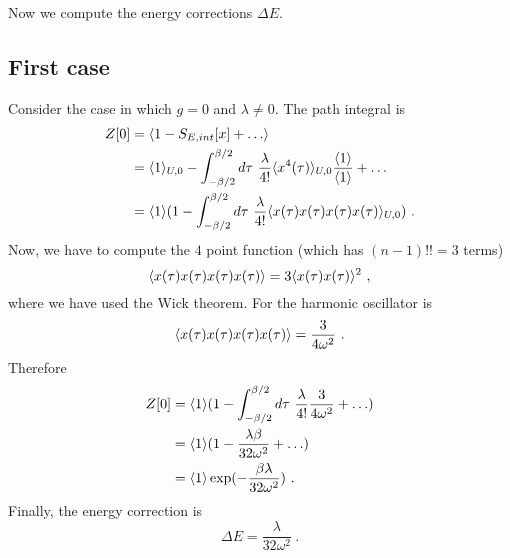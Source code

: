     Now we compute the energy corrections $\Delta E$. 

\subsection{First case}
    Consider the case in which $g = 0$ and $\lambda \neq 0$. The path integral is 
    \begin{equation*}
    \begin{aligned}
        Z[0] & = \langle1 - S_{E, int} [x] + \ldots\rangle \\ & = \langle1\rangle_{U, 0} - \int_{- \beta / 2}^{\beta/2} d\tau ~ \frac{\lambda}{4!} \langle x^4(\tau)\rangle_{U, 0} \frac{\langle1\rangle}{\langle1\rangle} + \ldots \\ & = \langle1\rangle ( 1 - \int_{- \beta / 2}^{\beta/2} d\tau ~ \frac{\lambda}{4!} \langle x(\tau) x(\tau) x(\tau) x(\tau)\rangle_{U, 0} ) ~.
    \end{aligned}
    \end{equation*} 
    Now, we have to compute the $4$ point function (which has $(n-1)!! = 3$ terms)
    \begin{equation*}
        \langle x(\tau) x(\tau) x(\tau) x(\tau)\rangle = 3 \langle x(\tau) x(\tau)\rangle^2 ~,
    \end{equation*}
    where we have used the Wick theorem. For the harmonic oscillator is 
    \begin{equation*}
        \langle x(\tau) x(\tau) x(\tau) x(\tau)\rangle = \frac{3}{4 \omega^2} ~.
    \end{equation*}
    Therefore
    \begin{equation*}
    \begin{aligned}
        Z[0] & = \langle1\rangle ( 1 - \int_{- \beta / 2}^{\beta/2} d\tau ~ \frac{\lambda}{4!} \frac{3}{4 \omega^2} + \ldots) \\ & = \langle1\rangle ( 1 - \frac{\lambda \beta}{32 \omega^2} + \ldots) \\ & = \langle1\rangle \exp(- \frac{\beta \lambda}{32 \omega^2} ) ~.
    \end{aligned}
    \end{equation*}
    Finally, the energy correction is 
    \begin{equation*}
        \Delta E = \frac{\lambda}{32 \omega^2} ~.
    \end{equation*}

